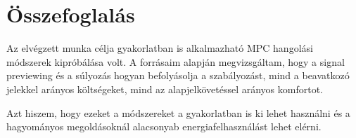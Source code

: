 \chapter{Összefoglalás}

Az elvégzett munka célja gyakorlatban is alkalmazható MPC hangolási módszerek kipróbálása volt. A forrásaim alapján megvizsgáltam, hogy a signal previewing és a súlyozás hogyan befolyásolja a szabályozást, mind a beavatkozó jelekkel arányos költségeket, mind az alapjelkövetéssel arányos komfortot.

Azt hiszem, hogy ezeket a módszereket a gyakorlatban is ki lehet használni és a hagyományos megoldásoknál alacsonyab energiafelhasználást lehet elérni.